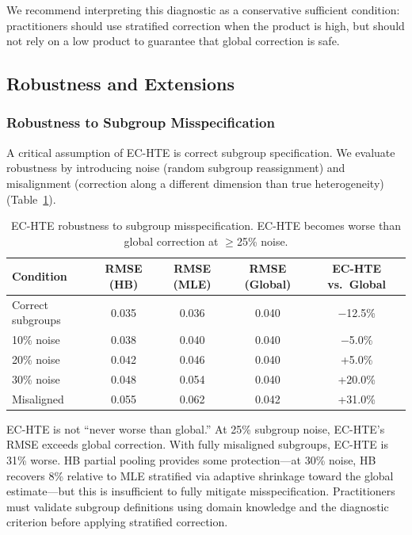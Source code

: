 \documentclass[11pt,a4paper]{article}
\begin{document}
We recommend interpreting this diagnostic as a conservative sufficient condition: practitioners should use stratified correction when the product is high, but should not rely on a low product to guarantee that global correction is safe.


\subsection{Robustness and Extensions}

\subsubsection{Robustness to Subgroup Misspecification}

A critical assumption of EC-HTE is correct subgroup specification. We evaluate robustness by introducing noise (random subgroup reassignment) and misalignment (correction along a different dimension than true heterogeneity) (Table~\ref{tab:robustness}).

\begin{table}[t]
\centering
\caption{EC-HTE robustness to subgroup misspecification. EC-HTE becomes worse than global correction at $\geq$25\% noise.}
\label{tab:robustness}
\begin{tabular}{@{}lcccc@{}}
\toprule
Condition & RMSE (HB) & RMSE (MLE) & RMSE (Global) & EC-HTE vs.\ Global \\
\midrule
Correct subgroups  & 0.035 & 0.036 & 0.040 & $-$12.5\% \\
10\% noise         & 0.038 & 0.040 & 0.040 & $-$5.0\% \\
20\% noise         & 0.042 & 0.046 & 0.040 & +5.0\% \\
30\% noise         & 0.048 & 0.054 & 0.040 & +20.0\% \\
Misaligned         & 0.055 & 0.062 & 0.042 & +31.0\% \\
\bottomrule
\end{tabular}
\end{table}

EC-HTE is not ``never worse than global.'' At 25\% subgroup noise, EC-HTE's RMSE exceeds global correction. With fully misaligned subgroups, EC-HTE is 31\% worse. HB partial pooling provides some protection---at 30\% noise, HB recovers 8\% relative to MLE stratified via adaptive shrinkage toward the global estimate---but this is insufficient to fully mitigate misspecification. Practitioners must validate subgroup definitions using domain knowledge and the diagnostic criterion before applying stratified correction.
\end{document}
